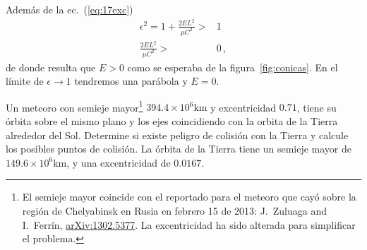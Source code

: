 Además de la ec.~(\ref{eq:17exc})
\begin{align}
  \epsilon^2=1+\frac{2EL^2}{\mu C^2}>&1\nonumber\\
  \frac{2EL^2}{\mu C^2}>&0\,,
\end{align}
de donde resulta que $E>0$ como se esperaba de la figura~\ref{fig:conicas}. En el límite de $\epsilon\to 1$ tendremos una parábola y $E=0$.

\ejemplo{}
Un meteoro con semieje mayor\footnote{El semieje mayor coincide con el reportado para el meteoro que cayó sobre la región de Chelyabinsk en Rusia en febrero 15 de 2013: J.~Zuluaga and I.~Ferrín, \href{http://arxiv.org/abs/1302.5377}{arXiv:1302.5377}. La excentricidad ha sido alterada para simplificar el problema.} ${394.4\times10^{6}}\si{\kilo\meter}$ y  excentricidad $0.71$, tiene su órbita sobre el mismo plano y los ejes coincidiendo con la orbita de la Tierra alrededor del Sol. Determine si existe peligro de colisión con la Tierra y calcule  los posibles puntos de colisión. La órbita de la Tierra tiene un semieje mayor de ${149.6\times10^{6}}\si{\kilo\meter}$,  y una excentricidad de $0.0167$.

